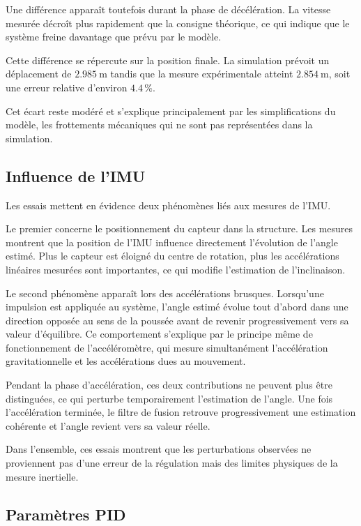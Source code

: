 Une différence apparaît toutefois durant la phase de décélération. La vitesse mesurée décroît plus rapidement que la consigne théorique, ce qui indique que le système freine davantage que prévu par le modèle.

Cette différence se répercute sur la position finale. La simulation prévoit un déplacement de $2.985~\si{\meter}$ tandis que la mesure expérimentale atteint $2.854~\si{\meter}$, soit une erreur relative d'environ $4.4\,\%$.

Cet écart reste modéré et s'explique principalement par les simplifications du modèle, les frottements mécaniques qui ne sont pas représentées dans la simulation.

\subsection{Influence de l'IMU}

Les essais mettent en évidence deux phénomènes liés aux mesures de l'IMU.

Le premier concerne le positionnement du capteur dans la structure. Les mesures montrent que la position de l'IMU influence directement l'évolution de l'angle estimé. Plus le capteur est éloigné du centre de rotation, plus les accélérations linéaires mesurées sont importantes, ce qui modifie l'estimation de l'inclinaison.

Le second phénomène apparaît lors des accélérations brusques. Lorsqu'une impulsion est appliquée au système, l'angle estimé évolue tout d'abord dans une direction opposée au sens de la poussée avant de revenir progressivement vers sa valeur d'équilibre. Ce comportement s'explique par le principe même de fonctionnement de l'accéléromètre, qui mesure simultanément l'accélération gravitationnelle et les accélérations dues au mouvement.

Pendant la phase d'accélération, ces deux contributions ne peuvent plus être distinguées, ce qui perturbe temporairement l'estimation de l'angle. Une fois l'accélération terminée, le filtre de fusion retrouve progressivement une estimation cohérente et l'angle revient vers sa valeur réelle.

Dans l'ensemble, ces essais montrent que les perturbations observées ne proviennent pas d'une erreur de la régulation mais des limites physiques de la mesure inertielle.

\subsection{Paramètres PID}

